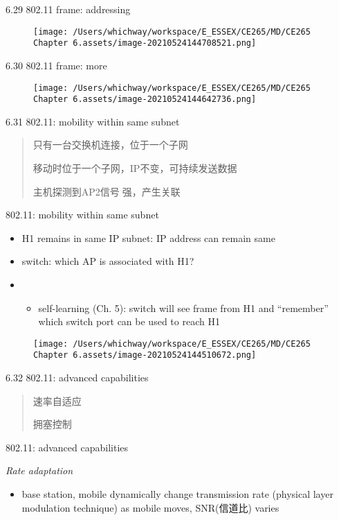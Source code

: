 \documentclass[
]{article}
\begin{document}
6.29 802.11 frame: addressing

\begin{figure}
\centering
\texttt{[image: /Users/whichway/workspace/E\_ESSEX/CE265/MD/CE265 Chapter 6.assets/image-20210524144708521.png]}
\caption{}
\end{figure}

6.30 802.11 frame: more

\begin{figure}
\centering
\texttt{[image: /Users/whichway/workspace/E\_ESSEX/CE265/MD/CE265 Chapter 6.assets/image-20210524144642736.png]}
\caption{}
\end{figure}

6.31 802.11: mobility within same subnet

\begin{quote}
只有一台交换机连接，位于一个子网

移动时位于一个子网，IP不变，可持续发送数据

主机探测到AP2信号📶强，产生关联
\end{quote}

802.11: mobility within same subnet

\begin{itemize}
\item
  H1 remains in same IP subnet: IP address can remain same
\item
  switch: which AP is associated with H1?
\item
  \begin{itemize}
  \item
    self-learning (Ch. 5): switch will see frame from H1 and
    ``remember'' which switch port can be used to reach H1
  \end{itemize}
\end{itemize}

\begin{figure}
\centering
\texttt{[image: /Users/whichway/workspace/E\_ESSEX/CE265/MD/CE265 Chapter 6.assets/image-20210524144510672.png]}
\caption{}
\end{figure}

6.32 802.11: advanced capabilities

\begin{quote}
速率自适应

拥塞控制
\end{quote}

802.11: advanced capabilities

\emph{Rate adaptation}

\begin{itemize}
\item
  base station, mobile dynamically change transmission rate (physical
  layer modulation technique) as mobile moves, SNR(信道比) varies
\end{itemize}
\end{document}
